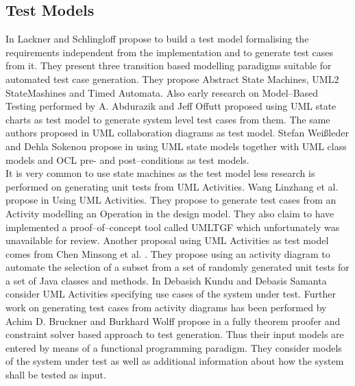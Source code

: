 \subsection{Test Models}
In \cite{lackner2012modeling} Lackner and Schlingloff propose to build a test model formalising the requirements independent from the implementation and to generate test cases from it. They present three transition based modelling paradigms suitable for automated test case generation. They propose Abstract State Machines, UML2 StateMashines and Timed Automata. Also early research on Model--Based Testing performed by A. Abdurazik and Jeff Offutt \cite{Offutt:1999:GeneratingTestsFromUmlSpec} proposed using UML state charts as test model to generate system level test cases from them. The same authors proposed in \cite{Abdurazik00usingumlCollaborationTestGeneration} UML collaboration diagrams as test model. Stefan Wei{\ss}leder and Dehla Sokenou propose in \cite{weissleder2008automatic} using UML state models together with UML class models and OCL pre- and post--conditions as test models.\\
It is very common to use state machines as the test model less research is performed on generating unit tests from UML Activities. Wang Linzhang et al. propose in \cite{Linzhang04GeneratingTestCasefromActivityGrayBoxMethod} Using UML Activities. They propose to generate test cases from an Activity modelling an Operation in the design model. They also claim to have implemented a proof--of--concept tool called UMLTGF which unfortunately was unavailable for review. Another proposal using UML Activities as test model comes from Chen Minsong et al. \cite{mingsong2006automatic}. They propose using an activity diagram to automate the selection of a subset from a set of randomly generated unit tests for a set of Java classes and methods. In \cite{kundu2009novel} Debasish Kundu and Debasis Samanta consider UML Activities specifying use cases of the system under test. Further work on generating test cases from activity diagrams has been performed by \cite{Patel12TestCaseFormationUsigUMLActivityDiagram}\\
Achim D. Bruckner and Burkhard Wolff propose in \cite{brucker2012theoremProverBasedTesting} a fully theorem proofer and constraint solver based approach to test generation. Thus their input models are entered by means of a functional programming paradigm. They consider models of the system under test as well as additional information about how the system shall be tested as input.\\
